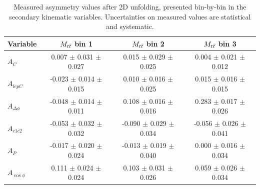 \begin{table}[hbt]
\begin{center}
\caption{Measured asymmetry values after 2D unfolding, presented
  bin-by-bin in the secondary kinematic variables. Uncertainties on
  measured values are statistical and systematic.}
\label{tab:afb:results2d:binbybin}
\begin{tabular}{l |  c  c  c }
\hline
Variable & $M_{t\bar{t}}$ bin 1 & $M_{t\bar{t}}$ bin 2 & $M_{t\bar{t}}$ bin 3  \\ \hline
$A_{C}$                                 &       0.007   $\pm$   0.031   $\pm$   0.027   &       0.015   $\pm$   0.029   $\pm$   0.025   &       0.004   $\pm$   0.021   $\pm$   0.012   \\
$A_{lepC}$                              &       -0.023  $\pm$   0.014   $\pm$   0.015   &       0.010   $\pm$   0.016   $\pm$   0.025   &       0.015   $\pm$   0.016   $\pm$   0.015   \\
$A_{\Delta\phi}$        &       -0.048  $\pm$   0.014   $\pm$   0.011   &       0.108   $\pm$   0.016   $\pm$   0.016   &       0.283   $\pm$   0.017   $\pm$   0.026   \\
$A_{c1c2}$                              &       -0.053  $\pm$   0.032   $\pm$   0.032   &       -0.090  $\pm$   0.029   $\pm$   0.034   &       -0.056  $\pm$   0.026   $\pm$   0.041   \\
$A_{P}$                  &       -0.017  $\pm$   0.020   $\pm$   0.024   &       -0.013  $\pm$   0.019   $\pm$   0.040   &       0.000   $\pm$   0.016   $\pm$   0.034   \\
$A_{\cos\phi}$                              &       0.111   $\pm$   0.024   $\pm$   0.024   &       0.103   $\pm$   0.031   $\pm$   0.026   &       0.059   $\pm$   0.026   $\pm$   0.034   \\
 \hline


\end{tabular}
\end{center}
\end{table}
